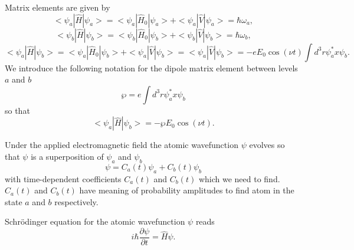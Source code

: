 \documentclass[preprint,preprintnumbers]{revtex4}
\begin{document}
Matrix elements are given by%
\begin{equation}
<\psi _{a}|\hat{H}|\psi _{a}>=<\psi _{a}|\hat{H}_{0}|\psi _{a}>+<\psi _{a}|%
\hat{V}|\psi _{a}>=\hbar \omega _{a},
\end{equation}%
\begin{equation}
<\psi _{b}|\hat{H}|\psi _{b}>=<\psi _{b}|\hat{H}_{0}|\psi _{b}>+<\psi _{b}|%
\hat{V}|\psi _{b}>=\hbar \omega _{b},
\end{equation}%
\begin{equation}
<\psi _{a}|\hat{H}|\psi _{b}>=<\psi _{a}|\hat{H}_{0}|\psi _{b}>+<\psi _{a}|%
\hat{V}|\psi _{b}>=<\psi _{a}|\hat{V}|\psi _{b}>=-eE_{0}\cos (\nu t)\int
d^{3}r\psi _{a}^{\ast }x\psi _{b}.
\end{equation}%
We introduce the following notation for the dipole matrix element between
levels $a$ and $b$%
\begin{equation}
\wp =e\int d^{3}r\psi _{a}^{\ast }x\psi _{b}
\end{equation}%
so that%
\begin{equation}
<\psi _{a}|\hat{H}|\psi _{b}>=-\wp E_{0}\cos (\nu t).
\end{equation}

Under the applied electromagnetic field the atomic wavefunction $\psi $
evolves so that $\psi $ is a superposition of $\psi _{a}$ and $\psi _{b}$
\begin{equation}
\psi =C_{a}(t)\psi _{a}+C_{b}(t)\psi _{b}  \label{a1}
\end{equation}%
with time-dependent coefficients $C_{a}(t)$ and $C_{b}(t)$ which we need to
find. $C_{a}(t)$ and $C_{b}(t)$ have meaning of probability amplitudes to
find atom in the state $a$ and $b$ respectively.

Schr\"{o}dinger equation for the atomic wavefunction $\psi $ reads%
\begin{equation}
i\hbar \frac{\partial \psi }{\partial t}=\hat{H}\psi .  \label{a2}
\end{equation}
\end{document}
